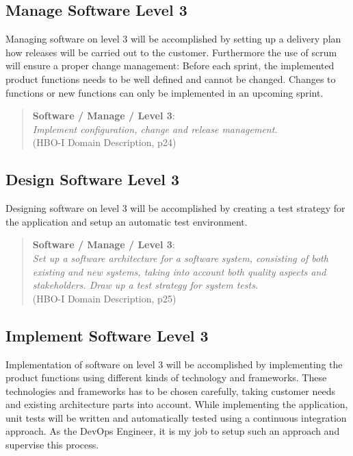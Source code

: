 \subsection{Manage Software Level 3}

Managing software on level 3 will be accomplished by setting up a delivery plan how releases will be carried out to the customer. Furthermore the use of scrum will ensure a proper change management: Before each sprint, the implemented product functions needs to be well defined and cannot be changed. Changes to functions or new functions can only be implemented in an upcoming sprint.

\begin{quote}
	\textbf{Software / Manage / Level 3}: \\
	\textit{Implement configuration, change and release management.} \\
	(HBO-I Domain Description, p24)
\end{quote}


\subsection{Design Software Level 3}

Designing software on level 3 will be accomplished by creating a test strategy for the application and setup an automatic test environment. 

\begin{quote}
	\textbf{Software / Manage / Level 3}: \\
	\textit{
		Set up a software architecture for a software system, consisting of both existing and new systems, taking into account both quality aspects and stakeholders. 
		Draw up a test strategy for system tests.
	} \\ (HBO-I Domain Description, p25)
\end{quote}


\subsection{Implement Software Level 3}

Implementation of software on level 3 will be accomplished by implementing the product functions using different kinds of technology and frameworks. These technologies and frameworks has to be chosen carefully, taking customer needs and existing architecture parts into account.
While implementing the application, unit tests will be written and automatically tested using a continuous integration approach. As the DevOps Engineer, it is my job to setup such an approach and supervise this process.

